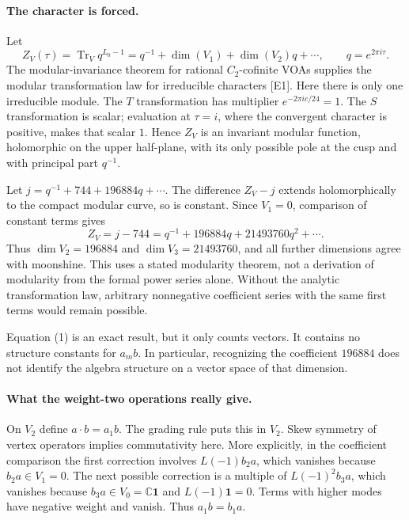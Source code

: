 \documentclass[11pt]{article}
\begin{document}
\paragraph{The character is forced.}
Let
\[
 Z_V(\tau)=\operatorname{Tr}_V q^{L_0-1}
 =q^{-1}+\dim(V_1)+\dim(V_2)q+\cdots,
 \qquad q=e^{2\pi i\tau}.
\]
The modular-invariance theorem for rational $C_2$-cofinite VOAs supplies the modular transformation law for irreducible characters [E1]. Here there is only one irreducible module. The $T$ transformation has multiplier $e^{-2\pi i c/24}=1$. The $S$ transformation is scalar; evaluation at $\tau=i$, where the convergent character is positive, makes that scalar $1$. Hence $Z_V$ is an invariant modular function, holomorphic on the upper half-plane, with its only possible pole at the cusp and with principal part $q^{-1}$.

Let $j=q^{-1}+744+196884q+\cdots$. The difference $Z_V-j$ extends holomorphically to the compact modular curve, so is constant. Since $V_1=0$, comparison of constant terms gives
\[
 Z_V=j-744=q^{-1}+196884q+21493760q^2+\cdots.              \tag{1}
\]
Thus $\dim V_2=196884$ and $\dim V_3=21493760$, and all further dimensions agree with moonshine. This uses a stated modularity theorem, not a derivation of modularity from the formal power series alone. Without the analytic transformation law, arbitrary nonnegative coefficient series with the same first terms would remain possible.

Equation (1) is an exact result, but it only counts vectors. It contains no structure constants for $a_m b$. In particular, recognizing the coefficient $196884$ does not identify the algebra structure on a vector space of that dimension.

\paragraph{What the weight-two operations really give.}
On $V_2$ define $a\cdot b=a_1b$. The grading rule puts this in $V_2$. Skew symmetry of vertex operators implies commutativity here. More explicitly, in the coefficient comparison the first correction involves $L(-1)b_2a$, which vanishes because $b_2a\in V_1=0$. The next possible correction is a multiple of $L(-1)^2b_3a$, which vanishes because $b_3a\in V_0=\mathbb C\mathbf1$ and $L(-1)\mathbf1=0$. Terms with higher modes have negative weight and vanish. Thus $a_1b=b_1a$.
\end{document}
